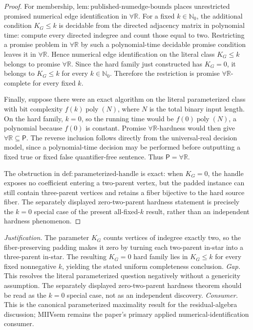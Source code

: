 \documentclass{article}
\begin{document}
\begin{proof}
For membership, \(\mathrm{lem:published\mbox{-}numedge\mbox{-}bounds}\) places unrestricted promised numerical edge identification in \(\forall\mathbb R\). For a fixed \(k\in\mathbb N_0\), the additional condition \(K_G\le k\) is decidable from the directed adjacency matrix in polynomial time: compute every directed indegree and count those equal to two. Restricting a promise problem in \(\forall\mathbb R\) by such a polynomial-time decidable promise condition leaves it in \(\forall\mathbb R\). Hence numerical edge identification on the literal class \(K_G\le k\) belongs to promise \(\forall\mathbb R\). Since the hard family just constructed has \(K_G=0\), it belongs to \(K_G\le k\) for every \(k\in\mathbb N_0\). Therefore the restriction is promise \(\forall\mathbb R\)-complete for every fixed \(k\).

Finally, suppose there were an exact algorithm on the literal parameterized class with bit complexity \(f(k)\operatorname{poly}(N)\), where \(N\) is the total binary input length. On the hard family, \(k=0\), so the running time would be \(f(0)\operatorname{poly}(N)\), a polynomial because \(f(0)\) is constant. Promise \(\forall\mathbb R\)-hardness would then give \(\forall\mathbb R\subseteq\mathsf P\). The reverse inclusion follows directly from the universal-real decision model, since a polynomial-time decision may be performed before outputting a fixed true or fixed false quantifier-free sentence. Thus \(\mathsf P=\forall\mathbb R\).

The obstruction in \(\mathrm{def:parameterized\mbox{-}handle}\) is exact: when \(K_G=0\), the handle exposes no coefficient entering a two-parent vertex, but the padded instance can still contain three-parent vertices and retains a fiber bijective to the hard source fiber. The separately displayed zero-two-parent hardness statement is precisely the \(k=0\) special case of the present all-fixed-\(k\) result, rather than an independent hardness phenomenon.
\end{proof}
\par\smallskip\noindent \textit{Justification.} The parameter \(K_G\) counts vertices of indegree exactly two, so the fiber-preserving padding makes it zero by turning each two-parent in-star into a three-parent in-star. The resulting \(K_G=0\) hard family lies in \(K_G\le k\) for every fixed nonnegative \(k\), yielding the stated uniform completeness conclusion. \textit{Gap.} This resolves the literal parameterized question negatively without a genericity assumption. The separately displayed zero-two-parent hardness theorem should be read as the \(k=0\) special case, not as an independent discovery. \textit{Consumer.} This is the canonical parameterized maximality result for the residual-algebra discussion; MIIVsem remains the paper's primary applied numerical-identification consumer.
\end{document}
